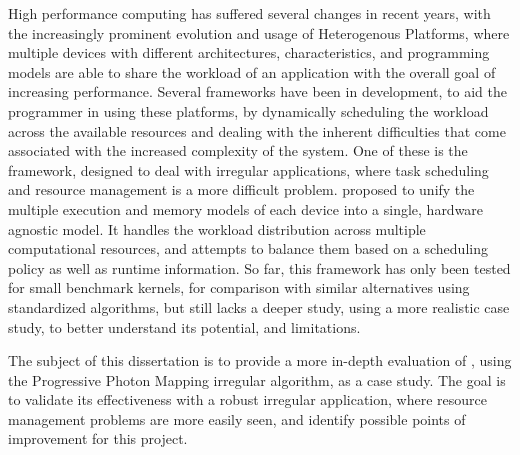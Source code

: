 \documentclass[main.tex]{subfiles}
\begin{document}
High performance computing has suffered several changes in recent years, with the increasingly prominent evolution and usage of Heterogenous Platforms, where multiple devices with different architectures, characteristics, and programming models are able to share the workload of an application with the overall goal of increasing performance. Several frameworks have been in development, to aid the programmer in using these platforms, by dynamically scheduling the workload across the available resources and dealing with the inherent difficulties that come associated with the increased complexity of the system. One of these is the \gama framework, designed to deal with irregular applications, where task scheduling and resource management is a more difficult problem. \gama proposed to unify the multiple execution and memory models of each device into a single, hardware agnostic model. It handles the workload distribution across multiple computational resources, and attempts to balance them based on a scheduling policy as well as runtime information. So far, this framework has only been tested for small benchmark kernels, for comparison with similar alternatives using standardized algorithms, but still lacks a deeper study, using a more realistic case study, to better understand its potential, and limitations.

The subject of this dissertation is to provide a more in-depth evaluation of \gama, using the Progressive Photon Mapping irregular algorithm, as a case study. The goal is to validate its effectiveness with a robust irregular application, where resource management problems are more easily seen, and identify possible points of improvement for this project.

\newpage
{}
\end{document}
